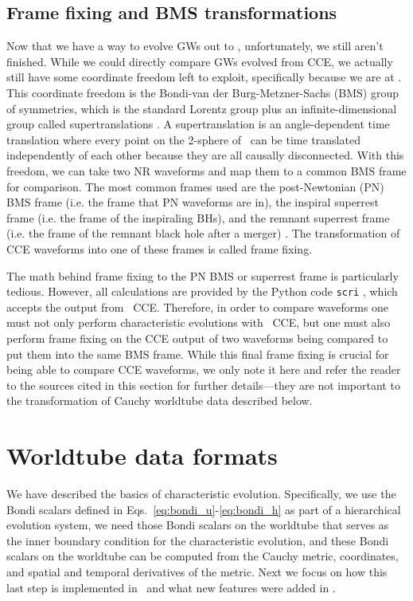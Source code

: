 \begin{bibunit}[unsrtnat]
\subsection{Frame fixing and BMS transformations}
Now that we have a way to evolve GWs out to \scri, unfortunately, we still
aren't finished. While we could directly compare GWs evolved from CCE, we
actually still have some coordinate freedom left to exploit, specifically
because we are at \scri. This coordinate freedom is the Bondi-van der
Burg-Metzner-Sachs (BMS) group of symmetries, which is the standard Lorentz
group plus an infinite-dimensional group called supertranslations
\cite{Bondi:1962px,Sachs:1962wk}. A supertranslation is an angle-dependent time
translation where every point on the 2-sphere of \scri~can be time translated
independently of each other because they are all causally disconnected. With
this freedom, we can take two NR waveforms and map them to a common BMS frame
for comparison. The most common frames used are the post-Newtonian (PN) BMS
frame (i.e. the frame that PN waveforms are in), the inspiral superrest frame
(i.e. the frame of the inspiraling BHs), and the remnant superrest frame (i.e.
the frame of the remnant black hole after a merger) \cite{Mitman:2022kwt}. The
transformation of CCE waveforms into one of these frames is called frame fixing.

The math behind frame fixing to the PN BMS or superrest frame is particularly
tedious. However, all calculations are provided by the Python code \texttt{scri}
\cite{mike_boyle_2020_4041972}, which accepts the output from \spectre~CCE.
Therefore, in order to compare waveforms one must not only perform
characteristic evolutions with \spectre~CCE, but one must also perform frame
fixing on the CCE output of two waveforms being compared to put them into the
same BMS frame. While this final frame fixing is crucial for being able to
compare CCE waveforms, we only note it here and refer the reader to the sources
cited in this section for further details---they are not important to the
transformation of Cauchy worldtube data described below.

\section{Worldtube data formats}
We have described
the basics of characteristic evolution. Specifically, we use
the Bondi scalars defined in Eqs.~\ref{eq:bondi_u}-\ref{eq:bondi_h} as part of a
hierarchical evolution system, we need those Bondi scalars on the worldtube
that serves as the inner boundary condition for the characteristic evolution,
and these Bondi scalars on the worldtube can be computed from the Cauchy metric,
coordinates, and spatial and temporal derivatives of the metric. Next we
focus on how this last step is implemented in \spectre~and what new features
were added in \spectre.


\end{bibunit}
